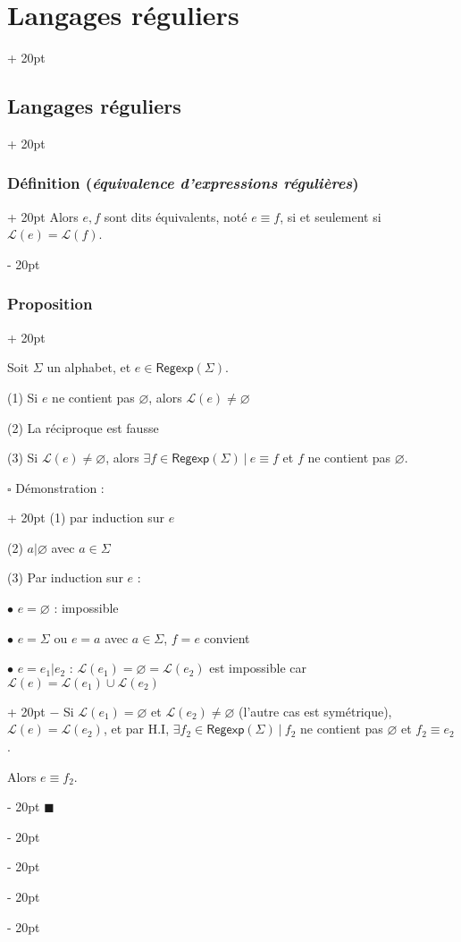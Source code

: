\documentclass[a4paper, 12pt, twoside]{article}
\newcommand{\ind}[1][20pt]{\advance\leftskip + #1}
\newcommand{\deind}[1][20pt]{\advance\leftskip - #1}
\newenvironment{indt}[2][20pt]{#2 \par \ind[#1]}{\par \deind} %
\newenvironment{proof}[1][{Démonstration :}]{\begin{indt}{$\square$ #1}}{$\blacksquare$ \end{indt}}
\newcommand{\Regexp}{\mathsf{Regexp}}
\begin{document}
\begin{indt}{\section{Langages réguliers}}
\begin{indt}{\subsection{Langages réguliers}}
\begin{indt}{\subsubsection{Définition (\textit{équivalence d'expressions régulières})}}
                Alors $e, f$ sont dits équivalents, noté $e \equiv f$, si et seulement si $\mathcal L(e) = \mathcal L(f)$.
            \end{indt}

            \vspace{12pt}
            
            \begin{indt}{\subsubsection{Proposition}}
                \begin{emphBox}
                    Soit $\Sigma$ un alphabet, et $e \in \Regexp(\Sigma)$.

                    (1) Si $e$ ne contient pas $\varnothing$, alors $\mathcal L(e) \neq \varnothing$

                    (2) La réciproque est fausse

                    (3) Si $\mathcal L(e) \neq \varnothing$, alors $\exists f \in \Regexp(\Sigma)\ |\ e \equiv f$ et $f$ ne contient pas $\varnothing$.
                \end{emphBox}

                \vspace{12pt}
                
                \begin{proof}
                    (1)  par induction sur $e$

                    (2) $a | \varnothing$ avec $a \in \Sigma$

                    (3) Par induction sur $e$ :

                    $\bullet$ $e = \varnothing$ : impossible

                    $\bullet$ $e = \Sigma$ ou $e = a$ avec $a \in \Sigma$, $f = e$ convient

                    \begin{indt}{$\bullet$ $e = e_1 | e_2$ : $\mathcal L(e_1) = \varnothing = \mathcal L(e_2)$ est impossible car $\mathcal L(e) = \mathcal L(e_1) \cup \mathcal L(e_2)$}
                        $-$ Si $\mathcal L(e_1) = \varnothing$ et $\mathcal L(e_2) \neq \varnothing$ (l'autre cas est symétrique), $\mathcal L(e) = \mathcal L(e_2)$, et par H.I, $\exists f_2 \in \Regexp(\Sigma)\ |\ f_2$ ne contient pas $\varnothing$ et $f_2 \equiv e_2$.

                        Alors $e \equiv f_2$.


\end{indt}
\end{proof}
\end{indt}
\end{indt}
\end{indt}
\end{document}
